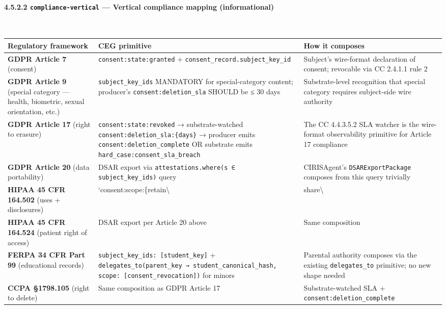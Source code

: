 \documentclass[11pt]{article}
\begin{document}
\paragraph{4.5.2.2 \texttt{compliance-vertical} — Vertical compliance mapping (informational)}\mbox{}\\


{\footnotesize
\begin{longtable}{|p{5.33cm}|p{5.33cm}|p{5.33cm}|}\hline
\textbf{Regulatory framework} & \textbf{CEG primitive} & \textbf{How it composes} \\ \hline\endhead
\textbf{GDPR Article 7} (consent) & \texttt{consent:state:granted} + \texttt{consent\_record.subject\_key\_id} & Subject's wire-format declaration of consent; revocable via CC 2.4.1.1 rule 2 \\ \hline
\textbf{GDPR Article 9} (special category — health, biometric, sexual orientation, etc.) & \texttt{subject\_key\_ids} MANDATORY for special-category content; producer's \texttt{consent:deletion\_sla} SHOULD be ≤ 30 days & Substrate-level recognition that special category requires subject-side wire authority \\ \hline
\textbf{GDPR Article 17} (right to erasure) & \texttt{consent:state:revoked} → substrate-watched \texttt{consent:deletion\_sla:\{days\}} → producer emits \texttt{consent:deletion\_complete} OR substrate emits \texttt{hard\_case:consent\_sla\_breach} & The CC 4.4.3.5.2 SLA watcher is the wire-format observability primitive for Article 17 compliance \\ \hline
\textbf{GDPR Article 20} (data portability) & DSAR export via \texttt{attestations.where(s ∈ subject\_key\_ids)} query & CIRISAgent's \texttt{DSARExportPackage} composes from this query trivially \\ \hline
\textbf{HIPAA 45 CFR 164.502} (uses + disclosures) & `consent:scope:\{retain\textbackslash{} & share\textbackslash{} \\ \hline
\textbf{HIPAA 45 CFR 164.524} (patient right of access) & DSAR export per Article 20 above & Same composition \\ \hline
\textbf{FERPA 34 CFR Part 99} (educational records) & \texttt{subject\_key\_ids: [student\_key]} + \texttt{delegates\_to(parent\_key → student\_canonical\_hash, scope: [consent\_revocation])} for minors & Parental authority composes via the existing \texttt{delegates\_to} primitive; no new shape needed \\ \hline
\textbf{CCPA §1798.105} (right to delete) & Same composition as GDPR Article 17 & Substrate-watched SLA + \texttt{consent:deletion\_complete} \\ \hline

\end{longtable}}
\end{document}
